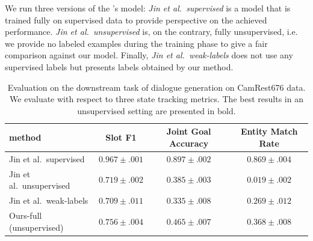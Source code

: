 We run three versions of the \citet{jin2018explicit}'s model: \emph{Jin et al.\ supervised} is a model that is trained fully on supervised data to provide perspective on the achieved performance.
\emph{Jin et al.\ unsupervised} is, on the contrary, fully unsupervised, i.e. we provide no labeled examples during the training phase to give a fair comparison against our model.
Finally, \emph{Jin et al.\ weak-labels} does not use any supervised labels but presents labels obtained by our method.

\begin{table}[tp]
    \centering
    \smaller
    \begin{tabular}{l|c|c|c}
    \hline
      \textbf{method} & \textbf{Slot F1} & \textbf{Joint Goal Accuracy} & \textbf{Entity Match Rate} \\
      \hline
        Jin et al.\ supervised & $0.967 \pm .001$ & $0.897 \pm .002$ & $0.869 \pm .004$ \\
        Jin et al.\ unsupervised & $0.719 \pm .002$ & $0.385 \pm .003$ & $0.019 \pm .002$ \\
        Jin et al.\ weak-labels & $0.709 \pm .011$ & $0.335 \pm .008$ & $0.269 \pm .012$ \\\hdashline[0.5pt/2pt]
        Ours-full (unsupervised) & $\pmb{0.756} \pm .004$ & $\pmb{0.465} \pm .007$ & $\pmb{0.368} \pm .008$ \\
     \hline
    \end{tabular}
    \caption{Evaluation on the downstream task of dialogue generation on CamRest676 data. We evaluate with respect to three state tracking metrics. The best results in an unsupervised setting are presented in bold.}
    \label{table:downstream}
\end{table}

